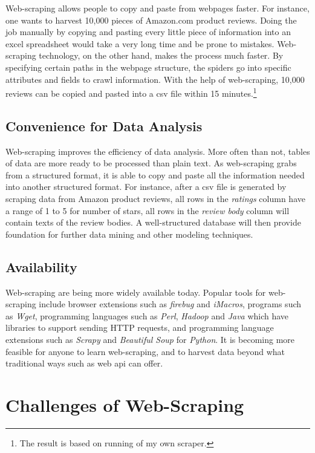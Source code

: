 \documentclass[12pt]{report}
\begin{document}
Web-scraping allows people to copy and paste from webpages faster. For instance, one wants to harvest 10,000 pieces of Amazon.com product reviews. Doing the job manually by copying and pasting every little piece of information into an excel spreadsheet would take a very long time and be prone to mistakes. Web-scraping technology, on the other hand, makes the process much faster. By specifying certain paths in the webpage structure, the spiders go into specific attributes and fields to \gls{crawl} information. With the help of web-scraping, 10,000 reviews can be copied and pasted into a \gls{csv} file within 15 minutes.\footnote{The result is based on running of my own scraper.}

\subsection{Convenience for Data Analysis}

Web-scraping improves the efficiency of data analysis. More often than not, tables of data are more ready to be processed than plain text. As web-scraping grabs from a structured format, it is able to copy and paste all the information needed into another structured format. For instance, after a \gls{csv} file is generated by scraping data from Amazon product reviews, all rows in the \textit{ratings} column have a range of 1 to 5 for number of stars, all rows in the \textit{review body} column will contain texts of the review bodies. A well-structured database will then provide foundation for further data \gls{mining} and other modeling techniques.

\subsection{Availability}

Web-scraping are being more widely available today. Popular tools for web-scraping include browser extensions such as \textit{firebug} and \textit{iMacros}, programs such as \textit{Wget}, programming languages such as \textit{Perl}, \textit{Hadoop} and \textit{Java} which have libraries to support sending HTTP requests, and programming language extensions such as \textit{Scrapy} and \textit{Beautiful Soup} for \textit{Python}. It is becoming more feasible for anyone to learn web-scraping, and to \gls{harvest} data beyond what traditional ways such as web \gls{api} can offer.

\section{Challenges of Web-Scraping}
\end{document}
